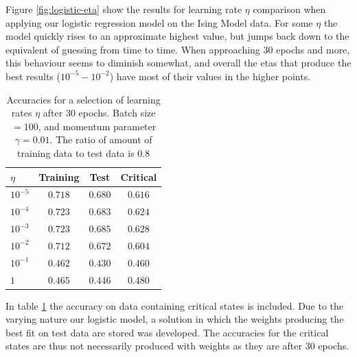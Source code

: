 Figure \ref{fig:logistic-eta} show the results for learning rate $\eta$ comparison when applying
our logistic regression model on the Ising Model data. For some $\eta$ the model quickly rises
to an approximate highest value, but jumps back down to the equivalent of guessing from time
to time. When approaching 30 epochs and more, this behaviour seems to diminish somewhat, and
overall the etas that produce the best results ($10^{-5} - 10^{-2}$) have most of their values
in the higher points.
\begin{table}[h]
\center
\begin{tabular}{l|c|c|c}
$\eta$ & Training & Test & Critical  \\
\hline
$10^{-5}$ & $0.718$ & $0.680$ & $0.616$ \\
$10^{-4}$ & $0.723$ & $0.683$ & $0.624$ \\
$10^{-3}$ & $0.723$ & $0.685$ & $0.628$ \\
$10^{-2}$ & $0.712$ & $0.672$ & $0.604$ \\
$10^{-1}$ & $0.462$ & $0.430$ & $0.460$ \\
$1$    & $0.465$ & $0.446$ & $0.480$
\end{tabular}
    \caption{Accuracies for a selection of learning rates $\eta$ after 
    30 epochs. Batch size $= 100$, and momentum parameter $\gamma = 0.01$.
    The ratio of amount of training data to test data is $0.8$}
    \label{tab:logistic-critical}
\end{table}
In table \ref{tab:logistic-critical} the accuracy on data containing critical states
is included. Due to the varying nature our logistic model, a solution in which the weights
producing the best fit on test data are stored was developed. The accuracies for the critical
states are thus not necessarily produced with weights as they are after 30 epochs.


